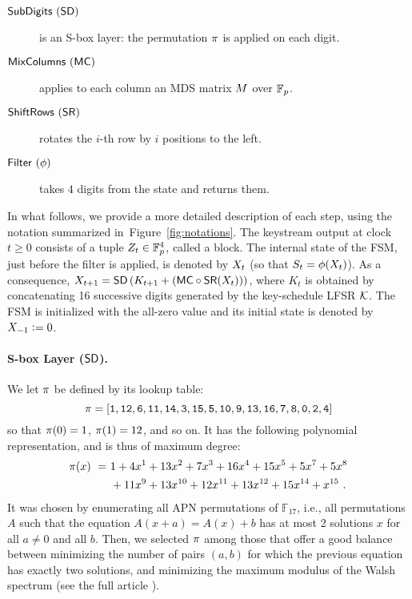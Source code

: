 \begin{description}
\item[$\text{\textsf{SubDigits}}~(\text{\textsf{SD}})$] is an S-box layer: the permutation $\pi$ is applied on each digit.
\item[$\text{\textsf{MixColumns}}~(\text{\textsf{MC}})$] applies to each column an MDS matrix $M$ over \(\mathbb{F}_p\).
\item[$\text{\textsf{ShiftRows}}~(\text{\textsf{SR}})$] rotates the $i$-th row by $i$ positions to the left.
\item[$\text{\textsf{Filter}}~(\mathbf{\phi})$] takes $4$ digits from the state and returns them. 
\end{description}

In what follows, we provide a more detailed description of each step, using the notation summarized in~Figure~\ref{fig:notations}. The keystream output at clock $t \geq 0$ consists of a tuple $Z_t \in \mathbb{F}_{p}^4$, called a block. The internal state of the FSM, just before the filter is applied, is denoted by $X_{t}$ (so that $S_t = \phi(X_{t})$). As a consequence, $X_{t+1} = \text{\textsf{SD}}\left(K_{t+1} + \left(\text{\textsf{MC}} \circ \text{\textsf{SR}} (X_{t})\right)\right)$, where $K_t$ is obtained by concatenating 16 successive digits generated by the key-schedule LFSR $\mathcal{K}$. The FSM is initialized with the all-zero value and its initial state is denoted by $X_{-1} \vcentcolon= 0$.







\paragraph{S-box Layer ($\text{\textsf{SD}}$).}
We let $\pi$ be defined by its lookup table:
\begin{equation}
  \label{eq:thesbox}
  \pi = {\tt [1, 12, 6, 11, 14, 3, 15, 5, 10, 9, 13, 16, 7, 8, 0, 2, 4]}
\end{equation}
so that $\pi(0) = 1$, $\pi(1) = 12$, and so on. It has the following polynomial representation, and is thus of maximum degree: %
\begin{equation*}
  \begin{split}
    \pi(x) ~=~& 1 + 4 x^{1} + 13 x^{2} + 7 x^{3} + 16 x^{4} + 15 x^{5} + 5 x^{7} + 5 x^{8} \\
    & + 11 x^{9} + 13 x^{10} + 12 x^{11} + 13 x^{12} + 15 x^{14} + x^{15}~.
  \end{split}
\end{equation*}
It was chosen by enumerating all APN permutations of $\mathbb{F}_{17}$, i.e., all permutations $A$ such that the equation $A(x+a)=A(x)+b$ has at most 2 solutions $x$ for all $a \neq 0$ and all $b$. Then, we selected $\pi$ among those that offer a good balance between minimizing the number of pairs $(a,b)$ for which the previous equation has exactly two solutions, and minimizing the maximum modulus of the Walsh spectrum (see the full article \cite{transistor}).



